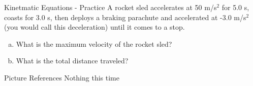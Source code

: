 \documentclass{beamer}
\begin{document}
\begin{frame}{Kinetmatic Equations - Practice}
   A rocket sled accelerates at 50 m/s$^2$ for 5.0 s, coasts for 3.0 s, then deploys a braking parachute and accelerated at -3.0 m/s$^2$ (you would call this deceleration) until it comes to a stop.
\begin{enumerate}[a.]
   \item What is the maximum velocity of the rocket sled?
   \item What is the total distance traveled?
\end{enumerate}
\end{frame}

\begin{frame}{Picture References}
\tiny
Nothing this time
\end{frame}
\end{document}

